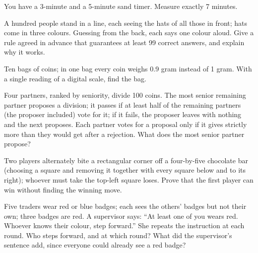 \begin{interviewq}\label{iq:iv:brainteasers-and-logic:5}
You have a 3-minute and a 5-minute sand timer. Measure exactly 7 minutes.
\end{interviewq}

\begin{interviewq}\label{iq:iv:brainteasers-and-logic:6}
A hundred people stand in a line, each seeing the hats of all those in front; hats come in three colours. Guessing
from the back, each says one colour aloud. Give a rule agreed in advance that guarantees at least 99 correct
answers, and explain why it works.
\end{interviewq}

\begin{interviewq}\label{iq:iv:brainteasers-and-logic:7}
Ten bags of coins; in one bag every coin weighs 0.9 gram instead of 1 gram. With a single reading of a digital
scale, find the bag.
\end{interviewq}

\begin{interviewq}\label{iq:iv:brainteasers-and-logic:8}
Four partners, ranked by seniority, divide 100 coins. The most senior remaining partner proposes a division;
it passes if at least half of the remaining partners (the proposer included) vote for it; if it fails, the
proposer leaves with nothing and the next proposes. Each partner votes for a proposal only if it gives strictly
more than they would get after a rejection. What does the most senior partner propose?
\end{interviewq}

\begin{interviewq}\label{iq:iv:brainteasers-and-logic:9}
Two players alternately bite a rectangular corner off a four-by-five chocolate bar (choosing a square and
removing it together with every square below and to its right); whoever must take the top-left square loses.
Prove that the first player can win without finding the winning move.
\end{interviewq}

\begin{interviewq}\label{iq:iv:brainteasers-and-logic:10}
Five traders wear red or blue badges; each sees the others' badges but not their own; three badges are red. A
supervisor says: ``At least one of you wears red. Whoever knows their colour, step forward.'' She repeats the
instruction at each round. Who steps forward, and at which round? What did the supervisor's sentence add, since
everyone could already see a red badge?
\end{interviewq}

